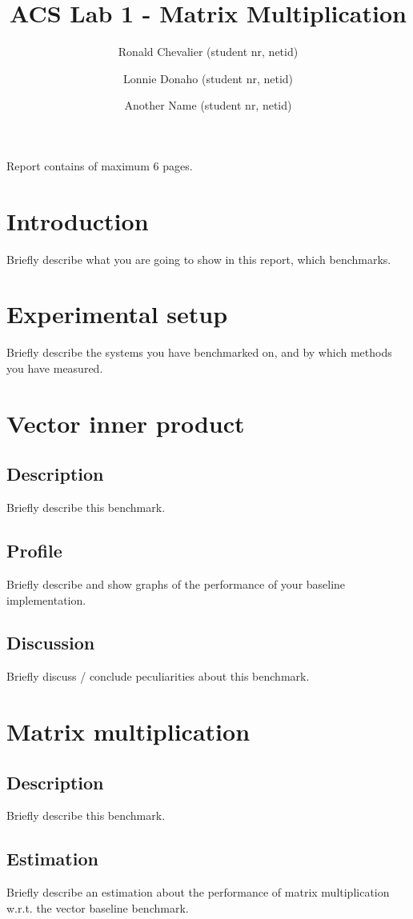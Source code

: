 \documentclass[twocolumn]{article}
\title{\large{\textbf{ACS Lab 1 - Matrix Multiplication}}}
\author{
    \small Ronald Chevalier (student nr, netid)
    \and \small Lonnie Donaho (student nr, netid)
    \and \small Another Name (student nr, netid)
}
\date{}
\begin{document}
\maketitle

\begin{center}
    \footnotesize{Report contains \pageref{LastPage} of maximum 6 pages.}
\end{center}

\section{Introduction}
Briefly describe what you are going to show in this report, which benchmarks.

\section{Experimental setup}
Briefly describe the systems you have benchmarked on, and by which methods you have measured.

\section{Vector inner product}
\subsection{Description}
Briefly describe this benchmark.
\subsection{Profile}
Briefly describe and show graphs of the performance of your baseline implementation.
\subsection{Discussion}
Briefly discuss / conclude peculiarities about this benchmark.

\section{Matrix multiplication}
\subsection{Description}
Briefly describe this benchmark.
\subsection{Estimation}
Briefly describe an estimation about the performance of matrix multiplication w.r.t. the vector baseline benchmark.
\end{document}
